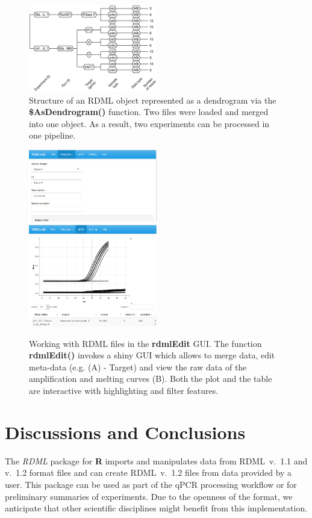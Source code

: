 \documentclass{bioinfo}
\begin{document}
\begin{figure}
\includegraphics[width=0.5\textwidth]{as_dendrogram.eps}
\caption{Structure of an RDML object represented as a dendrogram via the 
	\textbf{\$AsDendrogram()} function. Two files 
	were loaded and merged into one object. As a result, two 
	experiments can be processed in one pipeline.}\label{fig:01}
\end{figure}
\begin{figure}
\includegraphics[width=0.5\textwidth]{target.PNG}
\includegraphics[width=0.5\textwidth]{adp.PNG}
\caption{Working with RDML files in the \textbf{rdmlEdit} GUI. 
	The function \textbf{rdmlEdit()} invokes a shiny GUI which allows to merge data, edit meta-data (e.g. (A) - Target) and view the raw 
	data of the amplification and melting curves (B). Both the plot and 
	the table are interactive with highlighting and filter features.}\label{fig:02}
\end{figure}

\section{Discussions and Conclusions}
The \textit{RDML} package for \textbf{R} imports and manipulates data 
from RDML~v.~1.1 and v.~1.2 format files and can  create RDML~v.~1.2 files 
from data provided by a user. This package can be used as  part of the qPCR 
processing workflow or for preliminary summaries of experiments. Due to the 
openness of the format, we anticipate that other scientific disciplines might 
benefit from this implementation.
\end{document}
